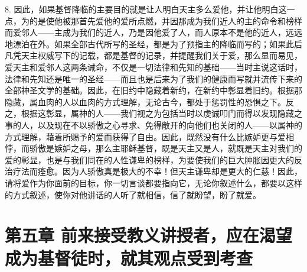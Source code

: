 8. 因此，如果基督降临的主要目的就是让人明白天主多么爱他，并让他明白这一点，为的是使他被那首先爱他的爱所点燃，并因那成为我们近人的主的命令和榜样而爱邻人——主成为我们的近人，乃是因他爱了人，而人原本不是他的近人，远远地漂泊在外。如果全部古代所写的圣经，都是为了预指主的降临而写的；如果此后凡凭天主权威写下的记载，都是基督的记录，并提醒我们关于爱，那么显而易见，爱天主和爱邻人这两条诫命，不仅是一切法律和先知的基础——当时主说这话时，法律和先知还是唯一的圣经——而且也是后来为了我们的健康而写就并流传下来的全部神圣文学的基础。因此，在旧约中隐藏着新约，在新约中彰显着旧约。根据那隐藏，属血肉的人以血肉的方式理解，无论古今，都处于惩罚性的恐惧之下。反之，根据这彰显，属神的人——我们视之为包括当时以虔诚叩门而得以发现隐藏之事的人，以及现在不以骄傲之心寻求、免得敞开的向他们也关闭的人——以属神的方式理解，藉着所赐予的爱而获得了自由。因此，既然没有什么比嫉妒更与爱相悖，而骄傲是嫉妒之母，那么主耶稣基督，既是天主又是人，就既是天主对我们的爱的彰显，也是与我们同在的人性谦卑的榜样，为要使我们的巨大肿胀因更大的反治疗法而痊愈。因为人骄傲真是极大的不幸！但天主谦卑却是更大的仁慈！因此，请将爱作为你面前的目标，你一切言谈都要指向它，无论你叙述什么，都要以这样的方式叙述，使你对他讲话的人听了就相信，信了就盼望，盼了就爱。\par


\section{第五章 前来接受教义讲授者，应在渴望成为基督徒时，就其观点受到考查}

